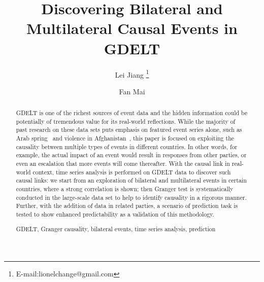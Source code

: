 \documentclass[runningheads,a4paper]{llncs}
\newcommand{\keywords}[1]{\par\addvspace\baselineskip
\noindent\keywordname\enspace\ignorespaces#1}
\begin{document}
\mainmatter  %

\title{Discovering Bilateral and Multilateral Causal Events in GDELT}


%
%
\author{Lei Jiang
\thanks{E-mail:lionelchange@gmail.com}%
\and Fan Mai
}
%


%
%

\maketitle


\begin{abstract}
GDELT is one of the richest sources of event data and the hidden information could be potentially of tremendous value for its real-world reflections. While the majority of past research on these data sets puts emphasis on featured event series alone, such as Arab spring~\cite{zack2013} and violence in Afghanistan~\cite{yonamine2013}, this paper is focused on exploiting the causality between multiple types of events in different countries. In other words, for example, the actual impact of an event would result in responses from other parties, or even an escalation that more events will come thereafter. With the causal link in real-world context, time series analysis is performed on GDELT data to discover such causal links: we start from an exploration of bilateral and multilateral events in certain countries, where a strong correlation is shown; then Granger test is systematically conducted in the large-scale data set to help to identify causality in a rigorous manner. Further, with the addition of data in related parties, a scenario of prediction task is tested to show enhanced predictability as a validation of this methodology. 
\keywords{GDELT, Granger causality, bilateral events, time series analysis, prediction}
\end{abstract}
\end{document}
